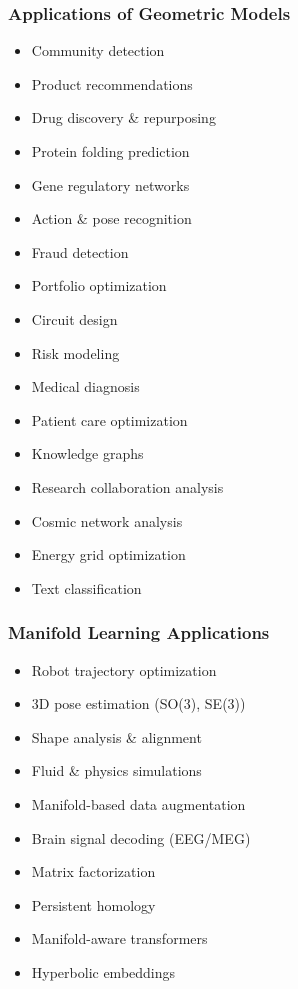 \begin{frame}[fragile]\frametitle{Applications of Geometric Models}
  \small
    \begin{itemize}
      \item Community detection
      \item Product recommendations
      \item Drug discovery \& repurposing
      \item Protein folding prediction
      \item Gene regulatory networks
      \item Action \& pose recognition
      \item Fraud detection
      \item Portfolio optimization
      \item Circuit design
      \item Risk modeling
      \item Medical diagnosis
      \item Patient care optimization
      \item Knowledge graphs
      \item Research collaboration analysis
      \item Cosmic network analysis
      \item Energy grid optimization
      \item Text classification
    \end{itemize}
\end{frame}

\begin{frame}[fragile]\frametitle{Manifold Learning Applications}
  \small
    \begin{itemize}
      \item Robot trajectory optimization
      \item 3D pose estimation (SO(3), SE(3))
      \item Shape analysis \& alignment
      \item Fluid \& physics simulations
      \item Manifold-based data augmentation
      \item Brain signal decoding (EEG/MEG)
      \item Matrix factorization
      \item Persistent homology
      \item Manifold-aware transformers
      \item Hyperbolic embeddings
    \end{itemize}
\end{frame}

